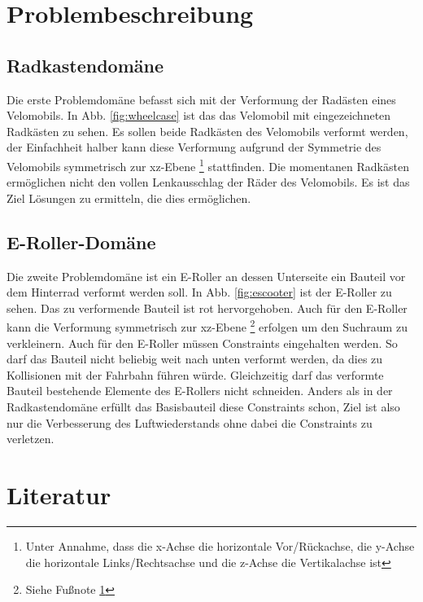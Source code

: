 \documentclass[12pt]{article}
\begin{document}
\section{Problembeschreibung}

\subsection{Radkastendomäne}

Die erste Problemdomäne befasst sich mit der Verformung der Radästen eines Velomobils. 
In Abb. \ref{fig:wheelcase} ist das das Velomobil mit eingezeichneten Radkästen zu sehen.
Es sollen beide Radkästen des Velomobils verformt werden, der Einfachheit halber kann diese Verformung aufgrund der Symmetrie des Velomobils symmetrisch zur xz-Ebene
\footnote{\label{foot:coords} Unter Annahme, dass die x-Achse die horizontale Vor/Rückachse, die y-Achse die horizontale Links/Rechtsachse und die z-Achse die Vertikalachse ist} stattfinden.
Die momentanen Radkästen ermöglichen nicht den vollen Lenkausschlag der Räder des Velomobils.
Es ist das Ziel Lösungen zu ermitteln, die dies ermöglichen.
                      
\subsection{E-Roller-Domäne}

Die zweite Problemdomäne ist ein E-Roller an dessen Unterseite ein Bauteil vor dem Hinterrad verformt werden soll.
In Abb. \ref{fig:escooter} ist der E-Roller zu sehen. Das zu verformende Bauteil ist rot hervorgehoben.
Auch für den E-Roller kann die Verformung symmetrisch zur xz-Ebene \footnote{Siehe Fußnote \ref{foot:coords}} erfolgen um den Suchraum zu verkleinern.
Auch für den E-Roller müssen Constraints eingehalten werden. 
So darf das Bauteil nicht beliebig weit nach unten verformt werden, da dies zu Kollisionen mit der Fahrbahn führen würde.
Gleichzeitig darf das verformte Bauteil bestehende Elemente des E-Rollers nicht schneiden.
Anders als in der Radkastendomäne erfüllt das Basisbauteil diese Constraints schon, Ziel ist also nur die Verbesserung des Luftwiederstands ohne dabei die Constraints zu verletzen.
 
\section{Literatur}
\end{document}
